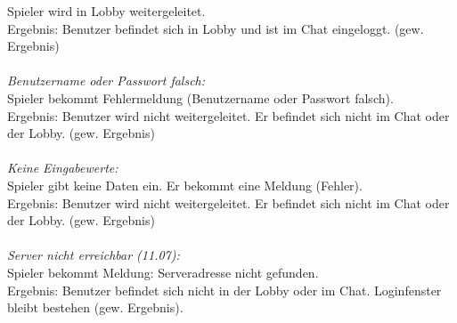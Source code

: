 \documentclass[10pt]{report}
\begin{document}
		Spieler wird in Lobby weitergeleitet. \\
		Ergebnis: Benutzer befindet sich in Lobby und ist im Chat eingeloggt. (gew. Ergebnis) \\
		\\
		\textsl{Benutzername oder Passwort falsch:} \\
		Spieler bekommt Fehlermeldung (Benutzername oder Passwort falsch). \\
		Ergebnis: Benutzer wird nicht weitergeleitet. Er befindet sich nicht im Chat oder der Lobby. 				(gew. Ergebnis) \\
		\\
		\textsl{Keine Eingabewerte:} \\
		Spieler gibt keine Daten ein. Er bekommt eine Meldung (Fehler). \\
		Ergebnis: Benutzer wird nicht weitergeleitet. Er befindet sich nicht im Chat oder der Lobby. 				(gew. Ergebnis) \\
		\\
		\textsl{Server nicht erreichbar (11.07):} \\
		Spieler bekommt Meldung: Serveradresse nicht gefunden. \\
		Ergebnis: Benutzer befindet sich nicht in der Lobby oder im Chat. Loginfenster bleibt bestehen 				(gew. Ergebnis). \\
		\\
		
\end{document}
